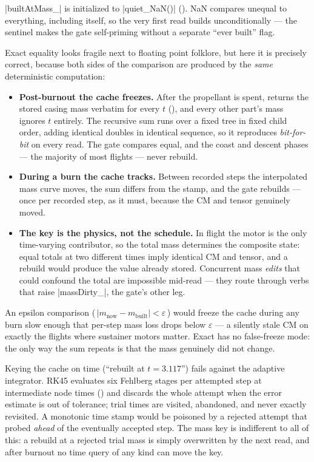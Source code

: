 \cppinline|builtAtMass_| is initialized to \cppinline|quiet_NaN()|
(). NaN compares unequal to everything, including itself, so the
very first read builds unconditionally --- the sentinel makes the gate self-priming without a
separate ``ever built'' flag.

Exact equality looks fragile next to floating point folklore, but here it is precisely correct,
because both sides of the comparison are produced by the \emph{same} deterministic computation:

\begin{itemize}
\item \textbf{Post-burnout the cache freezes.} After the propellant is spent,
       returns the stored casing mass verbatim for every $t$
      (), and every other part's mass ignores $t$ entirely. The
      recursive sum runs over a fixed tree in fixed child order, adding identical doubles in
      identical sequence, so it reproduces \emph{bit-for-bit} on every read. The gate compares
      equal, and the coast and descent phases --- the majority of most flights --- never rebuild.
\item \textbf{During a burn the cache tracks.} Between recorded steps the interpolated mass curve
      moves, the sum differs from the stamp, and the gate rebuilds --- once per recorded step,
      as it must, because the CM and tensor genuinely moved.
\item \textbf{The key is the physics, not the schedule.} In flight the motor is the only
      time-varying contributor, so the total mass determines the composite state: equal totals at
      two different times imply identical CM and tensor, and a rebuild would produce the value
      already stored. Concurrent mass \emph{edits} that could confound the total are impossible
      mid-read --- they route through verbs that raise \cppinline|massDirty_|, the gate's other
      leg.
\end{itemize}

\begin{rejected}
An epsilon comparison (\,$|m_{\text{now}} - m_{\text{built}}| < \varepsilon$\,) would freeze the
cache during any burn slow enough that per-step mass loss drops below $\varepsilon$ --- a silently
stale CM on exactly the flights where sustainer motors matter. Exact \code{==} has no false-freeze
mode: the only way the sum repeats is that the mass genuinely did not change.

Keying the cache on time (``rebuilt at $t = 3.117$'') fails against the adaptive integrator.
RK45 evaluates six Fehlberg stages per attempted step at intermediate node times
() and discards the whole attempt when the error estimate is out of
tolerance; trial times are visited, abandoned, and never exactly revisited. A monotonic time stamp
would be poisoned by a rejected attempt that probed \emph{ahead} of the eventually accepted step.
The mass key is indifferent to all of this: a rebuild at a rejected trial mass is simply
overwritten by the next read, and after burnout no time query of any kind can move the key.
\end{rejected}


